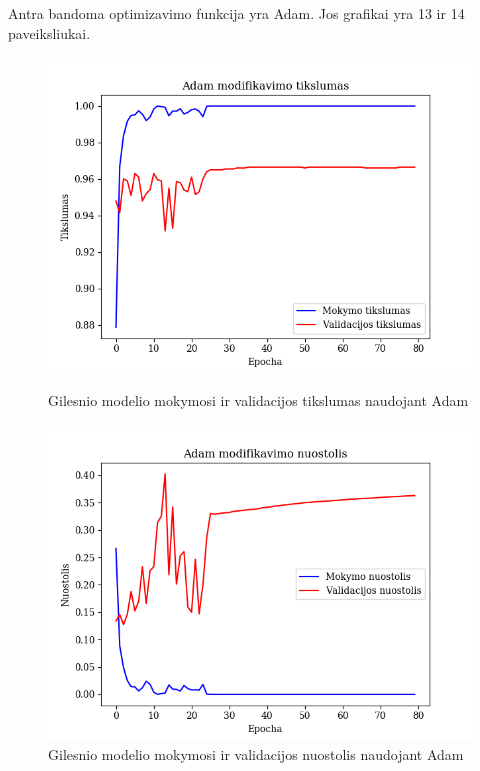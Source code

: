 \documentclass{VUMIFPSkursinis}
\begin{document}
Antra bandoma optimizavimo funkcija yra Adam. Jos grafikai yra 13 ir 14 paveiksliukai.

\begin{figure}[!htbp]
  \centering
  \begin{minipage}[b]{0.49\textwidth}
    \includegraphics[width=\textwidth]{img/AL/Adam_acc.png}
    \caption{Gilesnio modelio mokymosi ir validacijos tikslumas naudojant Adam}
  \end{minipage}
  \begin{minipage}[b]{0.49\textwidth}
    \includegraphics[width=\textwidth]{img/AL/Adam_loss.png}
    \caption{Gilesnio modelio mokymosi ir validacijos nuostolis naudojant Adam}
  \end{minipage}
\end{figure}
\end{document}
